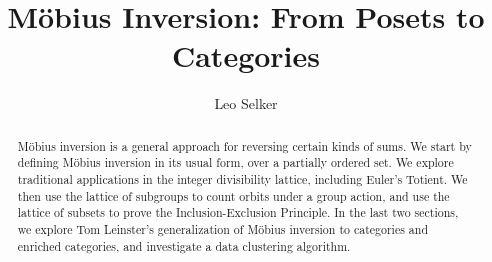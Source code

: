 \documentclass[12pt]{pom_thesis}
\author{Leo Selker}
\title{M\"obius Inversion: From Posets to Categories}
\begin{document}
\maketitle

\begin{abstract} M\"obius inversion is a general approach for reversing certain kinds of sums. We start by defining M\"obius inversion in its usual form, over a partially ordered set. We explore traditional applications in the integer divisibility lattice, including Euler's Totient. We then use the lattice of subgroups to count orbits under a group action, and use the lattice of subsets to prove the Inclusion-Exclusion Principle. In the last two sections, we explore Tom Leinster's generalization of M\"obius inversion to categories and enriched categories, and investigate a data clustering algorithm.
\end{abstract}

\tableofcontents
\end{document}
